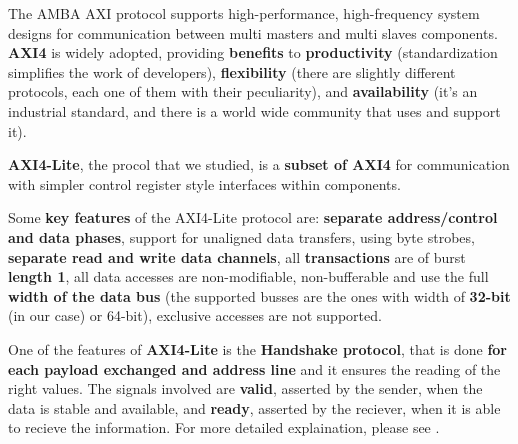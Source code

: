 {}

The AMBA AXI protocol supports high-performance, high-frequency system designs for communication between
multi masters and multi slaves components.
{\bf AXI4} is widely adopted, providing {\bf benefits} to {\bf productivity} (standardization simplifies the work of developers), {\bf flexibility} (there are slightly different protocols, each one of them with their peculiarity), and {\bf availability} (it's an industrial standard, and there is a world wide community that uses and support it).
\newline

{\bf AXI4-Lite}, the procol that we studied, is a {\bf subset of AXI4} for communication with simpler control register style interfaces within components.
\newline

Some {\bf key features} of the AXI4-Lite protocol are: {\bf separate address/control and data phases}, support for unaligned data transfers, using byte strobes, {\bf separate read and write data channels}, all {\bf transactions} are of burst {\bf length 1}, all data accesses are non-modifiable, non-bufferable and use the full {\bf width of the data bus} (the supported busses are the ones with width of {\bf 32-bit} (in our case) or 64-bit), exclusive accesses are not supported.
\newline

One of the features of {\bf AXI4-Lite} is the {\bf Handshake protocol}, that is done {\bf for each payload exchanged and address line} and it ensures the reading of the right values. The signals involved are {\bf valid}, asserted by the sender, when the data is stable and available, and {\bf ready}, asserted by the reciever, when it is able to recieve the information. For more detailed explaination, please see \cite[Section-A3.2.1]{AXISpecification}.

